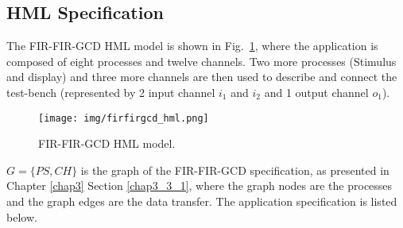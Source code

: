 \subsection{HML Specification}
%
The FIR-FIR-GCD HML model is shown in Fig.~\ref{firfirgcd_hml_model}, where the application is composed of eight processes and twelve channels. Two more processes (Stimulus and display) and three more channels are then used to describe and connect the test-bench (represented by 2 input channel $i_1$ and $i_2$ and 1 output channel $o_1$). \par
%
\begin{figure}[htbp]
	\centerline{\texttt{[image: img/firfirgcd\_hml.png]}}
	\caption{FIR-FIR-GCD HML model.}
	\label{firfirgcd_hml_model}
\end{figure}
%
$G = \{ PS,CH \}$ is the graph of the FIR-FIR-GCD specification, as presented in Chapter \ref{chap3} Section \ref{chap3_3_1}, where the graph nodes are the processes and the graph edges are the data transfer. The application specification is listed below.
%
\footnotesize
